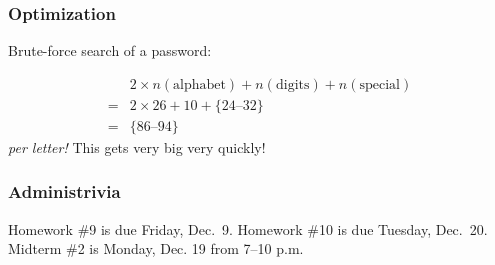 \documentclass[11pt]{beamer}
\begin{document}
\begin{frame}[fragile]
  \frametitle{Optimization}
  \Enlarge

  \begin{enumerate}
  \myitem  Brute-force search of a password: %
  \end{enumerate}
  $$
  \begin{array}{ll}
      & 2 \times n(\textrm{alphabet}) + n(\textrm{digits}) + n(\textrm{special}) \\
    = & 2 \times 26 + 10 + \{24\textrm{--}32\} \\
    = & \{86\textrm{--}94\}
  \end{array}
  $$
  \emph{per letter!}  This gets very big very quickly!
\end{frame}

\begin{frame}
	\frametitle{Administrivia}
	\Enlarge
	
	\begin{itemize}
		\myitem  Homework \#9 is due Friday, Dec.\ 9.
		\myitem  Homework \#10 is due Tuesday, Dec.\ 20.
		\myitem  Midterm \#2 is Monday, Dec. 19 from 7–10 p.m.
	\end{itemize}
\end{frame}
\end{document}
